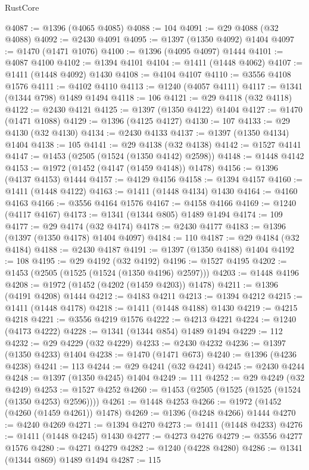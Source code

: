 \begin{lexlean}{RustCore}
\begin{coremodule}
{\begin{coremodule}
{{{{{{{{{{{{{{{{{{{{{{{{{{{{{{{{{{{{{{{{{{{{{@4087 := @1396 (@4065 @4085)
@4088 := 104
@4091 := @29 @4088 (@32 @4088)
@4092 := @2430 @4091
@4095 := @1397 (@1350 @4092) @1404
@4097 := @1470 (@1471 @1076)
@4100 := @1396 (@4095 @4097) @1444
@4101 := @4087 @4100
@4102 := @1394 @4101
@4104 := @1411 (@1448 @4062)
@4107 := @1411 (@1448 @4092) @1430
@4108 := @4104 @4107
@4110 := @3556 @4108 @1576
@4111 := @4102 @4110
@4113 := @1240 (@4057 @4111)
@4117 := @1341 (@1344 @798) @1489 @1494
@4118 := 106
@4121 := @29 @4118 (@32 @4118)
@4122 := @2430 @4121
@4125 := @1397 (@1350 @4122) @1404
@4127 := @1470 (@1471 @1088)
@4129 := @1396 (@4125 @4127)
@4130 := 107
@4133 := @29 @4130 (@32 @4130)
@4134 := @2430 @4133
@4137 := @1397 (@1350 @4134) @1404
@4138 := 105
@4141 := @29 @4138 (@32 @4138)
@4142 := @1527 @4141
@4147 := @1453 (@2505 (@1524 (@1350 @4142) @2598))
@4148 := @1448 @4142
@4153 := @1972 (@1452 (@4147 (@1459 @4148)) @1478)
@4156 := @1396 (@4137 @4153) @1444
@4157 := @4129 @4156
@4158 := @1394 @4157
@4160 := @1411 (@1448 @4122)
@4163 := @1411 (@1448 @4134) @1430
@4164 := @4160 @4163
@4166 := @3556 @4164 @1576
@4167 := @4158 @4166
@4169 := @1240 (@4117 @4167)
@4173 := @1341 (@1344 @805) @1489 @1494
@4174 := 109
@4177 := @29 @4174 (@32 @4174)
@4178 := @2430 @4177
@4183 := @1396 (@1397 (@1350 @4178) @1404 @4097)
@4184 := 110
@4187 := @29 @4184 (@32 @4184)
@4188 := @2430 @4187
@4191 := @1397 (@1350 @4188) @1404
@4192 := 108
@4195 := @29 @4192 (@32 @4192)
@4196 := @1527 @4195
@4202 := @1453 (@2505 (@1525 (@1524 (@1350 @4196) @2597)))
@4203 := @1448 @4196
@4208 := @1972 (@1452 (@4202 (@1459 @4203)) @1478)
@4211 := @1396 (@4191 @4208) @1444
@4212 := @4183 @4211
@4213 := @1394 @4212
@4215 := @1411 (@1448 @4178)
@4218 := @1411 (@1448 @4188) @1430
@4219 := @4215 @4218
@4221 := @3556 @4219 @1576
@4222 := @4213 @4221
@4224 := @1240 (@4173 @4222)
@4228 := @1341 (@1344 @854) @1489 @1494
@4229 := 112
@4232 := @29 @4229 (@32 @4229)
@4233 := @2430 @4232
@4236 := @1397 (@1350 @4233) @1404
@4238 := @1470 (@1471 @673)
@4240 := @1396 (@4236 @4238)
@4241 := 113
@4244 := @29 @4241 (@32 @4241)
@4245 := @2430 @4244
@4248 := @1397 (@1350 @4245) @1404
@4249 := 111
@4252 := @29 @4249 (@32 @4249)
@4253 := @1527 @4252
@4260 := @1453 (@2505 (@1525 (@1525 (@1524 (@1350 @4253) @2596))))
@4261 := @1448 @4253
@4266 := @1972 (@1452 (@4260 (@1459 @4261)) @1478)
@4269 := @1396 (@4248 @4266) @1444
@4270 := @4240 @4269
@4271 := @1394 @4270
@4273 := @1411 (@1448 @4233)
@4276 := @1411 (@1448 @4245) @1430
@4277 := @4273 @4276
@4279 := @3556 @4277 @1576
@4280 := @4271 @4279
@4282 := @1240 (@4228 @4280)
@4286 := @1341 (@1344 @869) @1489 @1494
@4287 := 115
}}}}}}}}}}}}}}}}}}}}}}}}}}}}}}}}}}}}}}}}}}}}}
\end{coremodule}}
\end{coremodule}
\end{lexlean}
